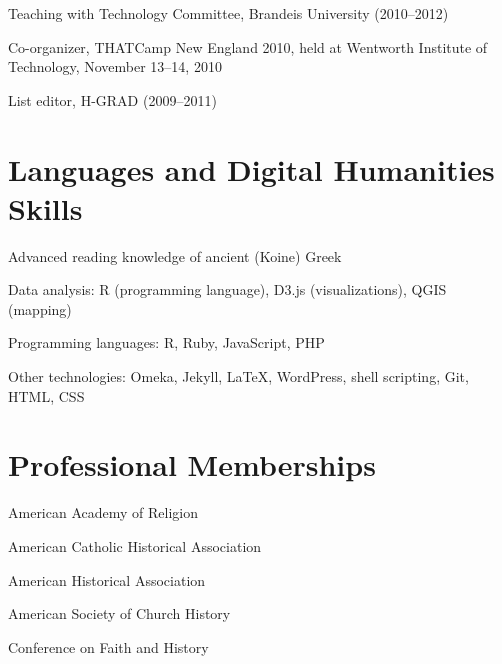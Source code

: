 \documentclass[11pt]{article}
\begin{document}
  Teaching with Technology Committee, Brandeis University (2010--2012)

  Co-organizer, THATCamp New England 2010, held at Wentworth Institute of 
  Technology, November 13--14, 2010

  List editor, H-GRAD (2009--2011)




  \section{Languages and Digital Humanities Skills}

  Advanced reading knowledge of ancient (Koine) Greek

  Data analysis: R (programming language), D3.js (visualizations), QGIS 
  (mapping)

  Programming languages: R, Ruby, JavaScript, PHP

  Other technologies: Omeka, Jekyll, \LaTeX{}, \mbox{WordPress}, shell scripting, 
  Git, HTML, CSS

  \section{Professional Memberships}

  American Academy of Religion

  American Catholic Historical Association

  American Historical Association

  American Society of Church History

  Conference on Faith and History






\end{document}
